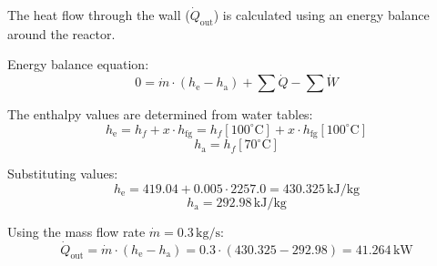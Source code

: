 The heat flow through the wall (\( \dot{Q}_{\text{out}} \)) is calculated using an energy balance around the reactor.  

Energy balance equation:  
\[
0 = \dot{m} \cdot (h_{\text{e}} - h_{\text{a}}) + \sum \dot{Q} - \sum \dot{W}
\]  

The enthalpy values are determined from water tables:  
\[
h_{\text{e}} = h_f + x \cdot h_{\text{fg}} = h_f[100^\circ\text{C}] + x \cdot h_{\text{fg}}[100^\circ\text{C}]
\]  
\[
h_{\text{a}} = h_f[70^\circ\text{C}]
\]  

Substituting values:  
\[
h_{\text{e}} = 419.04 + 0.005 \cdot 2257.0 = 430.325 \, \text{kJ/kg}
\]  
\[
h_{\text{a}} = 292.98 \, \text{kJ/kg}
\]  

Using the mass flow rate \( \dot{m} = 0.3 \, \text{kg/s} \):  
\[
\dot{Q}_{\text{out}} = \dot{m} \cdot (h_{\text{e}} - h_{\text{a}}) = 0.3 \cdot (430.325 - 292.98) = 41.264 \, \text{kW}
\]